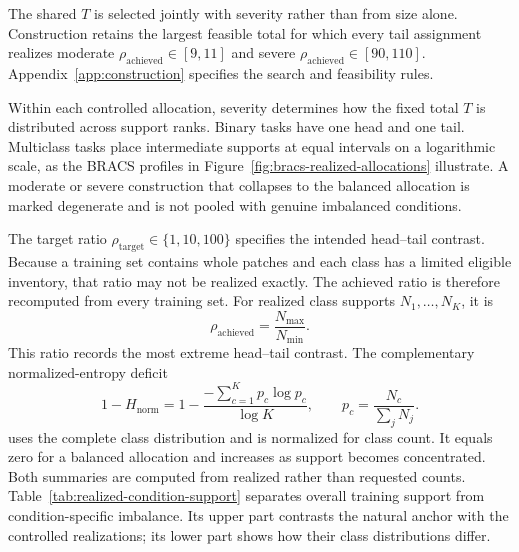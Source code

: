 \documentclass[11pt]{article}
\newcommand{\Hnorm}{1-H_{\mathrm{norm}}}
\begin{document}
\noindent The shared $T$ is selected jointly with severity rather than from size alone. Construction retains the largest feasible total for which every tail assignment realizes moderate $\rho_{\mathrm{achieved}}\in[9,11]$ and severe $\rho_{\mathrm{achieved}}\in[90,110]$. Appendix~\ref{app:construction} specifies the search and feasibility rules.

Within each controlled allocation, severity determines how the fixed total $T$ is distributed across support ranks. Binary tasks have one head and one tail. Multiclass tasks place intermediate supports at equal intervals on a logarithmic scale, as the BRACS profiles in Figure~\ref{fig:bracs-realized-allocations} illustrate. A moderate or severe construction that collapses to the balanced allocation is marked degenerate and is not pooled with genuine imbalanced conditions.

The target ratio $\rho_{\mathrm{target}}\in\{1,10,100\}$ specifies the intended head--tail contrast. Because a training set contains whole patches and each class has a limited eligible inventory, that ratio may not be realized exactly. The achieved ratio is therefore recomputed from every training set. For realized class supports $N_1,\ldots,N_K$, it is
\begin{equation}
  \rho_{\mathrm{achieved}}=\frac{N_{\max}}{N_{\min}}.
  \label{eq:rho}
\end{equation}
This ratio records the most extreme head--tail contrast. The complementary normalized-entropy deficit
\begin{equation}
  \Hnorm=1-\frac{-\sum_{c=1}^{K}p_c\log p_c}{\log K},
  \qquad p_c=\frac{N_c}{\sum_jN_j}.
  \label{eq:entropy}
\end{equation}
\noindent uses the complete class distribution and is normalized for class count. It equals zero for a balanced allocation and increases as support becomes concentrated. Both summaries are computed from realized rather than requested counts. Table~\ref{tab:realized-condition-support} separates overall training support from condition-specific imbalance. Its upper part contrasts the natural anchor with the controlled realizations; its lower part shows how their class distributions differ.
\end{document}

